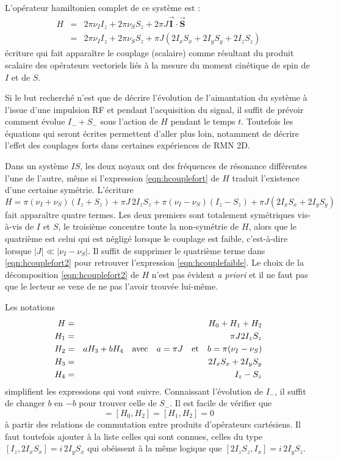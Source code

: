 L'opérateur hamiltonien complet de ce système est :
\begin{eqnarray}
H & = & 2\pi\nu_I I_z + 2\pi\nu_S S_z + 
2\pi J \boldsymbol{\vec{I}} \cdot \boldsymbol{\vec{S}} \\
\label{eqn:hcouplefort}
& = & 2\pi\nu_I I_z + 2\pi\nu_S S_z + 
\pi J (2I_xS_x + 2I_yS_y + 2I_zS_z)
\end{eqnarray}
écriture qui fait apparaître le couplage (scalaire) comme résultant du 
produit scalaire des opérateurs vectoriels liés à la mesure du moment cinétique
de spin de $I$ et de $S$.

Si le but recherché n'est que de décrire l'évolution de l'aimantation du système à
l'issue d'une impulsion RF et pendant l'acquisition du signal,
il suffit de prévoir comment évolue $I_- + S_-$ sous l'action de $H$
pendant le temps $t$.
Toutefois les équations qui seront écrites permettent d'aller plus loin,
notamment de décrire l'effet des couplages forts dans certaines
expériences de RMN 2D.

Dans un système $IS$, les deux noyaux ont des fréquences de résonance
différentes l'une de l'autre, même si l'expression 
\ref{eqn:hcouplefort} de $H$ traduit l'existence
d'une certaine symétrie.
L'écriture
\begin{equation}
\label{eqn:hcouplefort2}
H = \pi(\nu_I + \nu_S)(I_z + S_z) + \pi J \, 2I_zS_z + \pi(\nu_I - \nu_S)(I_z - S_z)
+ \pi J (2I_xS_x + 2I_yS_y)
\end{equation}
fait apparaître quatre termes.
Les deux premiers sont totalement symétriques
vis-à-vis de $I$ et $S$, le troisième concentre toute la non-symétrie de $H$,
alors que le quatrième est celui qui est négligé lorsque le couplage est faible,
c'est-à-dire lorsque $|J| \ll |\nu_I - \nu_S|$.
Il suffit de supprimer le quatrième terme dans \ref{eqn:hcouplefort2} pour
retrouver l'expression \ref{eqn:hcouplefaible}.
Le choix de la décomposition \ref{eqn:hcouplefort2} de $H$ n'est pas évident \emph{a priori}
et il ne faut pas que le lecteur se vexe de ne pas l'avoir trouvée lui-même.
 
Les notations
\begin{eqnarray}
H & = & H_0 + H_1 + H_2 \\
H_1 & = & \pi J 2I_zS_z \\
H_2 & = & a H_3 + b H_4 \quad \mbox{avec} \quad a = \pi J 
\quad \mbox{et} \quad b = \pi(\nu_I - \nu_S) \\
H_3 & = & 2I_xS_x + 2I_yS_y\\
H_4 & = & I_z - S_z
\end{eqnarray}
simplifient les expressions qui vont suivre.
Connaissant l'évolution de $I_-$, il suffit de changer $b$ en $-b$
pour trouver celle de $S_-$.
Il est facile de vérifier que
\begin{equation}
[H_0, H_1] = [H_0, H_2] = [H_1, H_2] =  0 
\end{equation}
à partir des relations de commutation entre produits d'opérateurs
cartésiens.
Il faut toutefois ajouter à la liste celles qui sont connues, celles
du type $[I_z, 2I_xS_x] = i \, 2I_yS_x$ qui obéissent à la même
logique que $[2I_zS_z, I_x] = i \, 2I_yS_z$.

